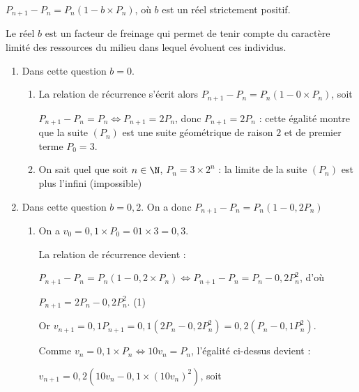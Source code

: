 \begin{center}$P_{n+1} -  P_n = P_n\left(1 -  b \times P_n\right)$, où $b$ est un réel strictement positif.\end{center}

Le réel $b$ est un facteur de freinage qui permet de tenir compte du caractère limité des
ressources du milieu dans lequel évoluent ces individus.

\medskip

\begin{enumerate}
\item Dans cette question $b  = 0$.
	\begin{enumerate}
		\item %
		La relation de récurrence s'écrit alors $P_{n+1} - P_n = P_n\left(1 - 0 \times P_n\right)$, soit 

$P_{n+1} - P_n = P_n \iff P_{n+1}  = 2 P_n$, donc $P_{n+1} = 2 P_n$ : cette égalité montre que la suite $\left(P_n\right)$ est une suite géométrique de raison $2$ et de premier terme $P_0 = 3$.
		\item %
On sait quel que soit $n \in \N$, \: $P_n = 3 \times 2^n$ : la limite de la suite $\left(P_n\right)$ est plus l'infini (impossible)
	\end{enumerate}
\item Dans cette question $b = 0,2$. On a donc $P_{n+1} - P_n = P_n\left(1 - 0,2P_n\right)$
	\begin{enumerate}
		\item %

On a $v_0 = 0,1 \times P_0 = 01 \times 3 = 0,3$.

La relation de récurrence devient :

$P_{n+1} -  P_n = P_n\left(1 -  0,2 \times P_n\right) \iff P_{n+1} -  P_n = P_n - 0,2P_n^2$, d'où

$P_{n+1} = 2P_n - 0,2P_n^2$. \: (1)

Or $v_{n+1} = 0,1P_{n+1} = 0,1\left(2P_n - 0,2P_n^2\right) = 0,2\left(P_n - 0,1P_n^2\right)$.

Comme $v_n = 0,1 \times P_n \iff 10v_n = P_n$, l'égalité ci-dessus devient :

$v_{n+1} = 0,2\left(10v_n - 0,1 \times \left(10v_n\right)^2\right)$, soit 


\end{enumerate}
\end{enumerate}
